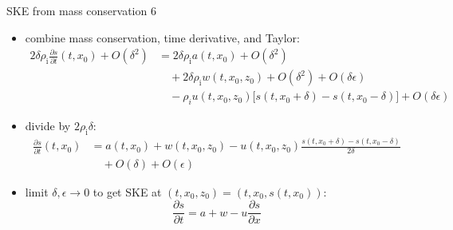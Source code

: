 \documentclass[10pt,dvipsnames]{beamer}
\newcommand{\eps}{\epsilon}
\newcommand{\rhoi}{\rho_{\text{i}}}
\begin{document}
\begin{frame}{SKE from mass conservation 6}

\begin{itemize}
\item combine mass conservation, time derivative, and Taylor:
\begin{align*}
2\delta \rhoi \frac{\partial s}{\partial t}(t,x_0) + O(\delta^2) &= 2\delta \rhoi a(t,x_0) + O(\delta^2) \\
  &\quad + 2\delta \rhoi w(t,x_0,z_0) + O(\delta^2) + O(\delta \eps) \\
  &\quad - \rho_i u(t,x_0,z_0) \Big[s(t,x_0+\delta) - s(t,x_0-\delta)\Big] + O(\delta \eps)
\end{align*}
\item divide by $2\rhoi\delta$:
\begin{align*}
\frac{\partial s}{\partial t}(t,x_0) &= a(t,x_0) + w(t,x_0,z_0) - u(t,x_0,z_0) \frac{s(t,x_0+\delta) - s(t,x_0-\delta)}{2\delta} \\
  &\quad  + O(\delta) + O(\eps)
\end{align*}
\item limit $\delta, \eps \to 0$ to get SKE at $(t,x_0,z_0) = (t,x_0,s(t,x_0))$:
  $$\frac{\partial s}{\partial t} = a + w - u \frac{\partial s}{\partial x}$$
\end{itemize}
\end{frame}
\end{document}
